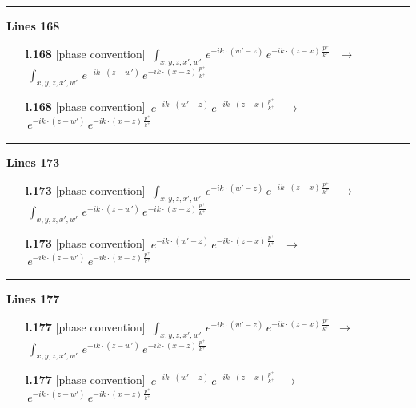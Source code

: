 \documentclass[10pt]{article}
\begin{document}
\noindent\rule{\linewidth}{0.3pt}\par\noindent\textbf{Lines 168} \par
\begin{itemize}[leftmargin=2.2em,itemsep=1pt,topsep=2pt]
\item[\textbf{l.168}] \textsf{\small [phase convention]} $\displaystyle \, \int_{x,y,z,x',w'}\,e^{-ik\cdot(w'-z)}\,e^{-ik\cdot (z-x)\,\frac{p^{+}}{k^{+}}}\,$\ $\longrightarrow$\ $\displaystyle \, \int_{x,y,z,x',w'}\,e^{-ik\cdot(z-w')}\,e^{-ik\cdot (x-z)\,\frac{p^{+}}{k^{+}}}\,$
\item[\textbf{l.168}] \textsf{\small [phase convention]} $\displaystyle \,e^{-ik\cdot(w'-z)}\,e^{-ik\cdot (z-x)\,\frac{p^{+}}{k^{+}}}\,$\ $\longrightarrow$\ $\displaystyle \,e^{-ik\cdot(z-w')}\,e^{-ik\cdot (x-z)\,\frac{p^{+}}{k^{+}}}\,$
\end{itemize}
\noindent\rule{\linewidth}{0.3pt}\par\noindent\textbf{Lines 173} \par
\begin{itemize}[leftmargin=2.2em,itemsep=1pt,topsep=2pt]
\item[\textbf{l.173}] \textsf{\small [phase convention]} $\displaystyle \, \int_{x,y,z,x',w'}\,e^{-ik\cdot(w'-z)}\,e^{-ik\cdot (z-x)\,\frac{p^{+}}{k^{+}}}\,$\ $\longrightarrow$\ $\displaystyle \, \int_{x,y,z,x',w'}\,e^{-ik\cdot(z-w')}\,e^{-ik\cdot (x-z)\,\frac{p^{+}}{k^{+}}}\,$
\item[\textbf{l.173}] \textsf{\small [phase convention]} $\displaystyle \,e^{-ik\cdot(w'-z)}\,e^{-ik\cdot (z-x)\,\frac{p^{+}}{k^{+}}}\,$\ $\longrightarrow$\ $\displaystyle \,e^{-ik\cdot(z-w')}\,e^{-ik\cdot (x-z)\,\frac{p^{+}}{k^{+}}}\,$
\end{itemize}
\noindent\rule{\linewidth}{0.3pt}\par\noindent\textbf{Lines 177} \par
\begin{itemize}[leftmargin=2.2em,itemsep=1pt,topsep=2pt]
\item[\textbf{l.177}] \textsf{\small [phase convention]} $\displaystyle \, \int_{x,y,z,x',w'}\,e^{-ik\cdot(w'-z)}\,e^{-ik\cdot (z-x)\,\frac{p^{+}}{k^{+}}}$\ $\longrightarrow$\ $\displaystyle \, \int_{x,y,z,x',w'}\,e^{-ik\cdot(z-w')}\,e^{-ik\cdot (x-z)\,\frac{p^{+}}{k^{+}}}$
\item[\textbf{l.177}] \textsf{\small [phase convention]} $\displaystyle \,e^{-ik\cdot(w'-z)}\,e^{-ik\cdot (z-x)\,\frac{p^{+}}{k^{+}}}$\ $\longrightarrow$\ $\displaystyle \,e^{-ik\cdot(z-w')}\,e^{-ik\cdot (x-z)\,\frac{p^{+}}{k^{+}}}$
\end{itemize}
\end{document}
